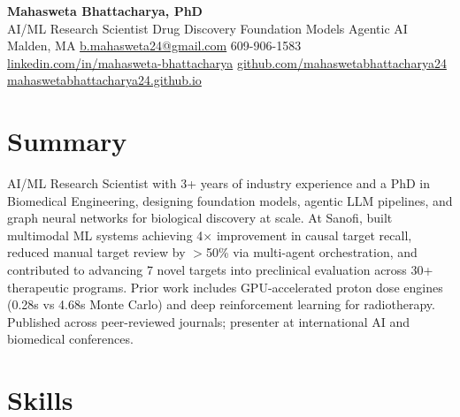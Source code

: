 \documentclass[11pt,letterpaper]{article}
\begin{document}
\begin{center}
  {\LARGE\bfseries Mahasweta Bhattacharya, PhD}\\[3pt]
  {AI/ML Research Scientist \textbar{} Drug Discovery \textbar{} Foundation Models \textbar{} Agentic AI}\\[4pt]
  Malden, MA \textbar{} \href{mailto:b.mahasweta24@gmail.com}{b.mahasweta24@gmail.com} \textbar{} 609-906-1583\\
  \href{https://www.linkedin.com/in/mahasweta-bhattacharya/}{linkedin.com/in/mahasweta-bhattacharya} \textbar{}
  \href{https://github.com/mahaswetabhattacharya24}{github.com/mahaswetabhattacharya24} \textbar{}
  \href{https://mahaswetabhattacharya24.github.io}{mahaswetabhattacharya24.github.io}
\end{center}

\section*{Summary}
AI/ML Research Scientist with 3+ years of industry experience and a PhD in Biomedical Engineering, designing
foundation models, agentic LLM pipelines, and graph neural networks for biological discovery at scale.
At Sanofi, built multimodal ML systems achieving 4$\times$ improvement in causal target recall, reduced
manual target review by $>$50\% via multi-agent orchestration, and contributed to advancing 7 novel targets
into preclinical evaluation across 30+ therapeutic programs. Prior work includes GPU-accelerated proton
dose engines (0.28s vs 4.68s Monte Carlo) and deep reinforcement learning for radiotherapy. Published
across peer-reviewed journals; presenter at international AI and biomedical conferences.

\section*{Skills}
\end{document}
